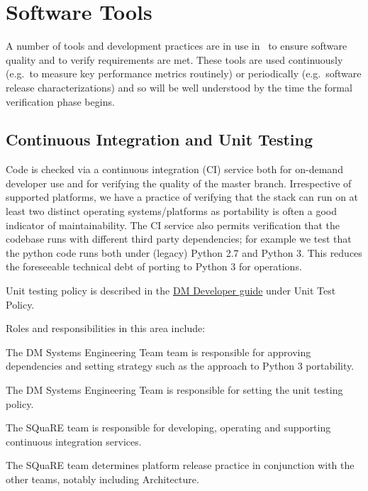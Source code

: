 \section{Software Tools}

A number of tools and development practices are in use in \product\ to ensure software quality and to verify requirements are met. These tools are used continuously (e.g.\ to measure key performance metrics routinely) or periodically (e.g.\ software release characterizations) and so will be well understood by the time the formal verification phase begins.

\subsection{Continuous Integration and Unit Testing}

Code is checked via a continuous integration (CI) service both for on-demand developer use and for verifying the quality of the master branch. Irrespective of supported platforms, we have a practice of verifying that the stack can run on at least two distinct operating systems/platforms as portability is often a good indicator of maintainability. The CI service also permits verification that the codebase runs with different third party dependencies; for example we test that the python code runs both under (legacy) Python 2.7 and Python 3. This reduces the foreseeable technical debt of porting to Python 3 for operations.

Unit testing policy is described in the \href{https://developer.lsst.io}{DM Developer guide} under Unit Test Policy.

Roles and responsibilities in this area include:

\begin{itemize_single}

\item The DM Systems Engineering Team team is responsible for approving dependencies and setting strategy such as the approach to Python 3 portability.

\item The DM Systems Engineering Team is responsible for setting the unit testing policy.

\item The SQuaRE team is responsible for developing, operating and supporting continuous integration services.

\item The SQuaRE team determines platform release practice in conjunction with the other teams, notably including Architecture.

\end{itemize_single}

